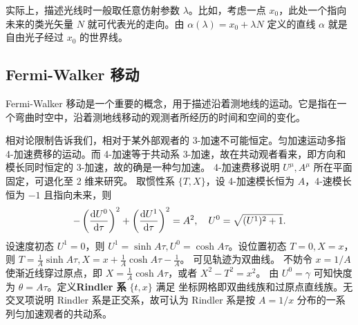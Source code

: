 实际上，描述光线时一般取任意仿射参数 $\lambda$。比如，考虑一点 $x_{0}$，此处一个指向未来的类光矢量 $N$ 就可代表光的走向。由 $\alpha(\lambda)=x_{0}+\lambda N$ 定义的直线 $\alpha$ 就是自由光子经过 $x_{0}$ 的世界线。

\subsection{Fermi-Walker 移动}
Fermi-Walker 移动是一个重要的概念，用于描述沿着测地线的运动。它是指在一个弯曲时空中，沿着测地线移动的观测者所经历的时间和空间的变化。

相对论限制告诉我们，相对于某外部观者的 3-加速不可能恒定。匀加速运动多指 4-加速费移的运动。而 4-加速等于共动系 3-加速，故在共动观者看来，即方向和模长同时恒定的 3-加速，故的确是一种匀加速。
4-加速费移说明 $U^\mu,A^\mu$ 所在平面固定，可退化至 2 维来研究。
取惯性系 $\{T,X\}$，设 4-加速模长恒为 $A$，4-速模长恒为 $-1$ 且指向未来，则
\[-\left(\dv{U^0}{\tau}\right)^2+\left(\dv{U^1}{\tau}\right)^2=A^2,\quad U^0=\sqrt{(U^1)^2+1}.\]
设速度初态 $U^1=0$，则 $U^1=\sinh A\tau,U^0=\cosh A\tau$。设位置初态 $T=0,X=x$，则 $T=\frac 1A\sinh A\tau,X=x+\frac 1A\cosh A\tau-\frac 1A$。
可见轨迹为双曲线。
不妨令 $x=1/A$ 使渐近线穿过原点，即 $X=\frac 1A\cosh A\tau$，或者 $X^2-T^2=x^2$。
由 $U^0=\gamma$ 可知快度为 $\theta=A\tau$。定义\textbf{Rindler 系} $\{t,x\}$ 满足
坐标网格即双曲线族和过原点直线族。无交叉项说明 Rindler 系是正交系，故可认为 Rindler 系是按 $A=1/x$ 分布的一系列匀加速观者的共动系。

